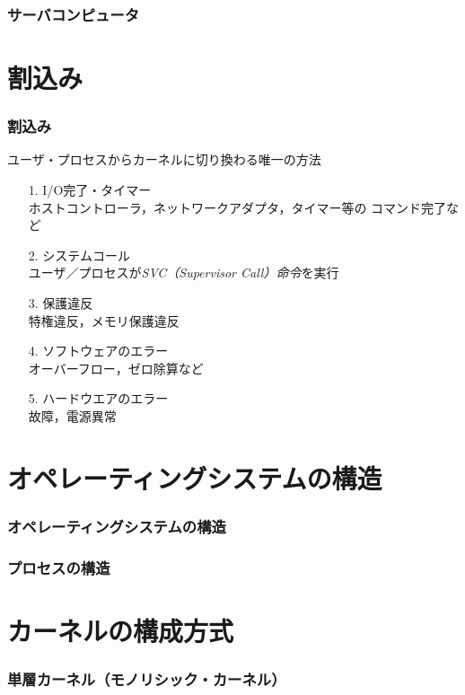 \documentclass[unicode]{beamer}                   %
\begin{document}
\begin{frame}
  \frametitle{サーバコンピュータ}
\end{frame}

\section{割込み}
\begin{frame}
  \frametitle{割込み}
  ユーザ・プロセスからカーネルに切り換わる唯一の方法
  \begin{enumerate}
    \item[1.] I/O完了・タイマー \\
      ホストコントローラ，ネットワークアダプタ，タイマー等の
      コマンド完了など
    \item[2.] システムコール \\
      ユーザ／プロセスが\emph{SVC（Supervisor Call）命令}を実行
    \item[3.] 保護違反 \\
      特権違反，メモリ保護違反
    \item[4.] ソフトウェアのエラー \\
      オーバーフロー，ゼロ除算など
    \item[5.] ハードウエアのエラー \\
      故障，電源異常
  \end{enumerate}
  \vfill
\end{frame}

\section{オペレーティングシステムの構造}
\begin{frame}
  \frametitle{オペレーティングシステムの構造}
\end{frame}

\begin{frame}
  \frametitle{プロセスの構造}
\end{frame}

\section{カーネルの構成方式}
\begin{frame}
  \frametitle{単層カーネル（モノリシック・カーネル）}
\end{frame}
\end{document}

